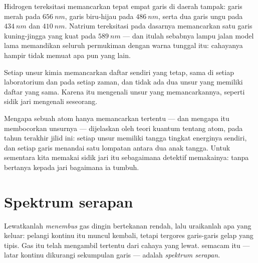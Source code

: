 \begin{example}\label{ex:g10:light-spectra:hydrogen}
Hidrogen tereksitasi memancarkan tepat empat garis di daerah tampak:
garis merah pada $\qty{656}{nm}$, garis biru-hijau pada
$\qty{486}{nm}$, serta dua garis ungu pada $\qty{434}{nm}$ dan
$\qty{410}{nm}$. Natrium tereksitasi pada dasarnya memancarkan satu
garis kuning-jingga yang kuat pada $\qty{589}{nm}$ --- dan itulah
sebabnya lampu jalan model lama memandikan seluruh permukiman dengan
warna tunggal itu: cahayanya hampir tidak memuat apa pun yang lain.
\end{example}

\begin{proposition}\label{prop:g10:light-spectra:fingerprint}
Setiap unsur kimia memancarkan daftar  sendiri yang
tetap, sama di setiap laboratorium dan pada setiap zaman, dan tidak ada
dua unsur yang memiliki daftar yang sama. Karena itu 
mengenali unsur yang memancarkannya, seperti sidik jari mengenali
seseorang.
\end{proposition}
\admitted

\begin{remark}\label{rem:g10:light-spectra:whylines}
Mengapa sebuah atom hanya memancarkan  tertentu ---
dan mengapa  itu membocorkan unsurnya --- dijelaskan
oleh teori kuantum tentang atom, pada tahun terakhir jilid ini: setiap
unsur memiliki tangga tingkat energinya sendiri, dan setiap garis
menandai satu lompatan antara dua anak tangga. Untuk sementara kita
memakai sidik jari itu sebagaimana detektif memakainya: tanpa bertanya
kepada jari bagaimana ia tumbuh.
\end{remark}

\section{Spektrum serapan}

\begin{definition}\label{def:g10:light-spectra:absorption}
Lewatkanlah  \emph{menembus} gas dingin bertekanan rendah,
lalu uraikanlah apa yang keluar: pelangi kontinu itu muncul kembali,
tetapi tergores garis-garis gelap yang tipis. Gas itu telah mengambil
 tertentu dari cahaya yang lewat.  semacam itu
--- latar kontinu dikurangi sekumpulan garis --- adalah \emph{spektrum
serapan}.
\end{definition}

